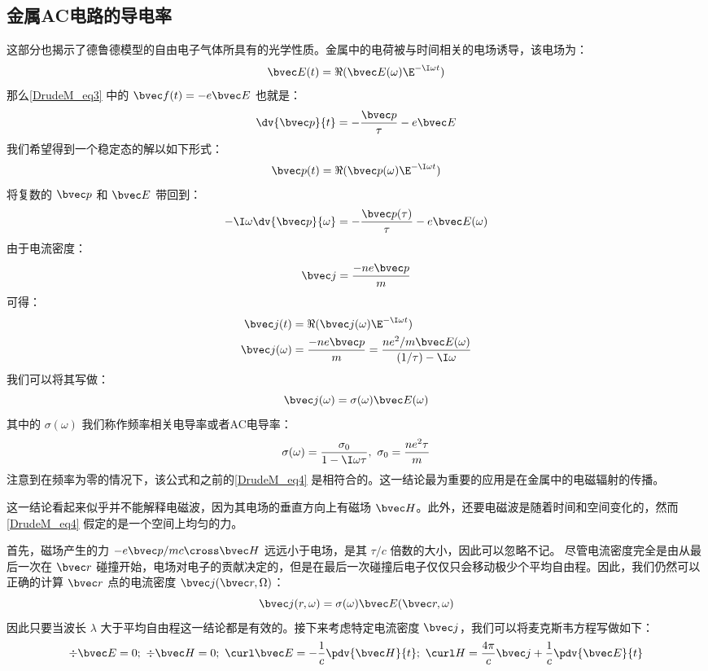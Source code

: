 \subsection{金属AC电路的导电率}
这部分也揭示了德鲁德模型的自由电子气体所具有的光学性质。金属中的电荷被与时间相关的电场诱导，该电场为：
\begin{equation}
\bvec E(t)=\Re(\bvec E(\omega)\E^{-\I\omega t})
\end{equation}
那么\autoref{DrudeM_eq3} 中的 $\bvec f(t)=-e\bvec E$ 也就是：
\begin{equation}
\dv{\bvec p}{t}=-\frac{\bvec p}{\tau}-e\bvec E
\end{equation}
我们希望得到一个稳定态的解以如下形式：
\begin{equation}
\bvec p(t)=\Re(\bvec p(\omega)\E^{-\I\omega t})
\end{equation}
将复数的 $\bvec p$ 和 $\bvec E$ 带回到：
\begin{equation}
-\I\omega\dv{\bvec p}{\omega}=-\frac{\bvec p(\tau)}{\tau}-e\bvec E(\omega)
\end{equation}
由于电流密度：
\begin{equation}
\bvec j = \frac{-ne\bvec p}{m}
\end{equation}
可得：
\begin{align}
\bvec j(t)&=\Re(\bvec j(\omega)\E^{-\I\omega t})\\
\bvec j(\omega)&=\frac{-ne\bvec p}{m}=\frac{ne^2/m\bvec E(\omega)}{(1/\tau)-\I\omega}
\end{align}
我们可以将其写做：
\begin{equation}
\bvec j(\omega)=\sigma(\omega)\bvec E(\omega)
\end{equation}
其中的 $\sigma(\omega)$ 我们称作频率相关电导率或者AC电导率：
\begin{equation}
\sigma(\omega)=\frac{\sigma_0}{1-\I\omega\tau},\ \sigma_0=\frac{ne^2\tau}{m}
\end{equation}
注意到在频率为零的情况下，该公式和之前的\autoref{DrudeM_eq4} 是相符合的。这一结论最为重要的应用是在金属中的电磁辐射的传播。

这一结论看起来似乎并不能解释电磁波，因为其电场的垂直方向上有磁场 $\bvec H$。此外，还要电磁波是随着时间和空间变化的，然而\autoref{DrudeM_eq4} 假定的是一个空间上均匀的力。

首先，磁场产生的力 $-e\bvec p/mc\cross \bvec H$ 远远小于电场，是其 $\tau/c$ 倍数的大小，因此可以忽略不记。
尽管电流密度完全是由从最后一次在 $\bvec r$ 碰撞开始，电场对电子的贡献决定的，但是在最后一次碰撞后电子仅仅只会移动极少个平均自由程。因此，我们仍然可以正确的计算 $\bvec r$ 点的电流密度 $\bvec j(\bvec r,\Omega)$：
\begin{equation}
\bvec j(r,\omega)=\sigma(\omega)\bvec E(\bvec r,\omega)
\end{equation}
因此只要当波长 $\lambda$ 大于平均自由程这一结论都是有效的。接下来考虑特定电流密度 $\bvec j$，我们可以将麦克斯韦方程写做如下：
\begin{equation}
\div \bvec E =0;\ \div \bvec H = 0;\ \curl \bvec E =-\frac{1}{c}\pdv{ \bvec H}{t};\ \curl H = \frac{4\pi}{c}\bvec j+\frac{1}{c}\pdv{ \bvec E}{t}
\end{equation}

